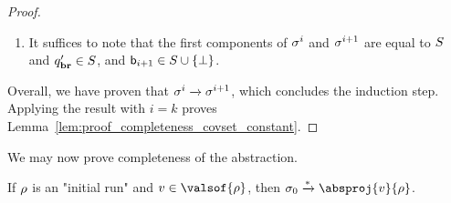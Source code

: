 \begin{proof}
\begin{enumerate}[label = (\arabic*)]
		\item It suffices to note that the first components of $\sigma^i$ and $\sigma^{i+1}$ are equal to $S$ and $q_{\textbf{br}}' \in S$, and $\mathsf{b}_{i+1} \in S \cup \{\bot\}$. 
	\end{enumerate}
	
	Overall, we have proven that $\sigma^i \xrightarrow{} \sigma^{i+1}$, which concludes the induction step. Applying the result with $i = k$ proves Lemma~\ref{lem:proof_completeness_covset_constant}. 
\end{proof}

We may now prove completeness of the abstraction. 

\begin{lemma}
	\label{lem:abstraction_complete}
	If $\rho$ is an "initial run" and $\aval \in \valsof{\run}$, then $\aconfiginit \step{*} \absproj{\aval}{\run}$. 
\end{lemma}

